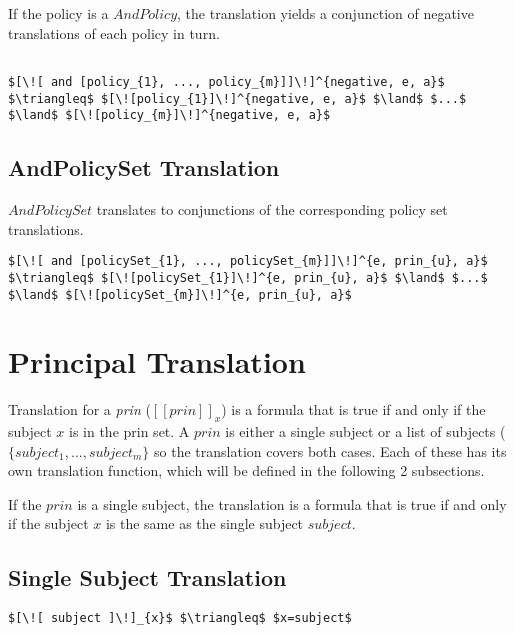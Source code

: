 If the policy is a $AndPolicy$, the translation yields a conjunction of negative translations of each policy in turn.

\lstset{mathescape, language=AST}  
\begin{lstlisting}[frame=single, caption={Negative Policy Translation {$\colon$} List of policies},label={lst:transpolicynegativeListOfPolicies}]

$[\![ and [policy_{1}, ..., policy_{m}]]\!]^{negative, e, a}$ $\triangleq$ $[\![policy_{1}]\!]^{negative, e, a}$ $\land$ $...$ $\land$ $[\![policy_{m}]\!]^{negative, e, a}$

\end{lstlisting}

\subsection{AndPolicySet Translation}
$AndPolicySet$ translates to conjunctions of the corresponding policy set translations. 

\lstset{mathescape, language=AST}  
\begin{lstlisting}[frame=single, caption={Policy Set Translation {$\colon$} AndPolicySet},label={lst:transpolicyformulaAndPolicySet}]
$[\![ and [policySet_{1}, ..., policySet_{m}]]\!]^{e, prin_{u}, a}$ $\triangleq$ $[\![policySet_{1}]\!]^{e, prin_{u}, a}$ $\land$ $...$ $\land$ $[\![policySet_{m}]\!]^{e, prin_{u}, a}$

\end{lstlisting}

\section{Principal Translation}
Translation for a \emph{prin} ($[\![ prin ]\!]_{x}$) is a formula that is true if and only if the subject $x$ is in the prin set. A $prin$ is either a single subject or a list of subjects ($\{ subject_{1}, ..., subject_{m} \}$ so the translation covers both cases. Each of these has its own translation function, which will be defined in the following 2 subsections.


If the $prin$ is a single subject, the translation is a formula that is true if and only if the subject $x$ is the same as the single subject $subject$.

\subsection{Single Subject Translation}
\lstset{mathescape, language=AST}  
\begin{lstlisting}[frame=single, caption={Prin Translation {$\colon$} Single subject},label={lst:transprinSingle}]
$[\![ subject ]\!]_{x}$ $\triangleq$ $x=subject$
\end{lstlisting}

